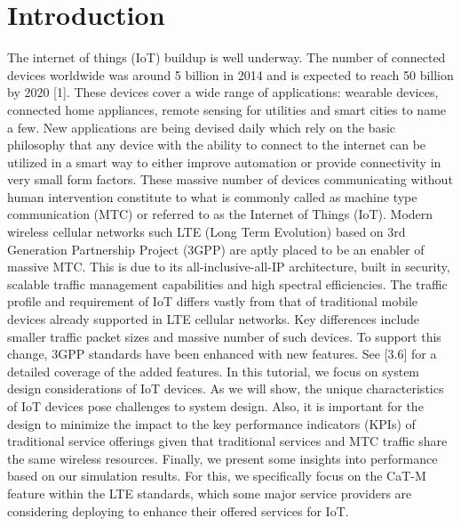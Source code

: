 \documentclass[conference,compsoc]{IEEEtran}
\begin{document}
\section{Introduction}
The internet of things (IoT) buildup is well underway. The number of connected devices worldwide was around 5 billion in 2014 and is expected to reach 50 billion by 2020 [1]. These devices cover a wide range of applications:  wearable devices, connected home appliances, remote sensing for utilities and smart cities to name a few. New applications are being devised daily which rely on the basic philosophy that any device with the ability to connect to the internet can be utilized in a smart way to either improve automation or provide connectivity in very small form factors. These massive number of devices communicating without human intervention constitute to what is commonly called as machine type communication (MTC) or referred to as the Internet of Things (IoT). Modern wireless cellular networks such LTE (Long Term Evolution) based on 3rd Generation Partnership Project (3GPP) are aptly placed to be an enabler of massive MTC. This is due to its all-inclusive-all-IP architecture, built in security, scalable traffic management capabilities and high spectral efficiencies.
The traffic profile and requirement of IoT differs vastly from that of traditional mobile devices already supported in LTE cellular networks. Key differences include smaller traffic packet sizes and massive number of such devices. To support this change, 3GPP standards have been enhanced with new features. See [3.6] for a detailed coverage of the added features.
In this tutorial, we focus on system design considerations of IoT devices. As we will show, the unique characteristics of IoT devices pose challenges to system design.  Also, it is important for  the design to minimize the impact to the key performance indicators (KPIs) of traditional service offerings given that  traditional services and MTC traffic share the same wireless resources. Finally, we present some insights into performance based on our simulation results. For this, we specifically focus on the CaT-M feature within the LTE standards, which some major service providers are considering deploying to enhance their offered services for IoT.


 
\end{document}
